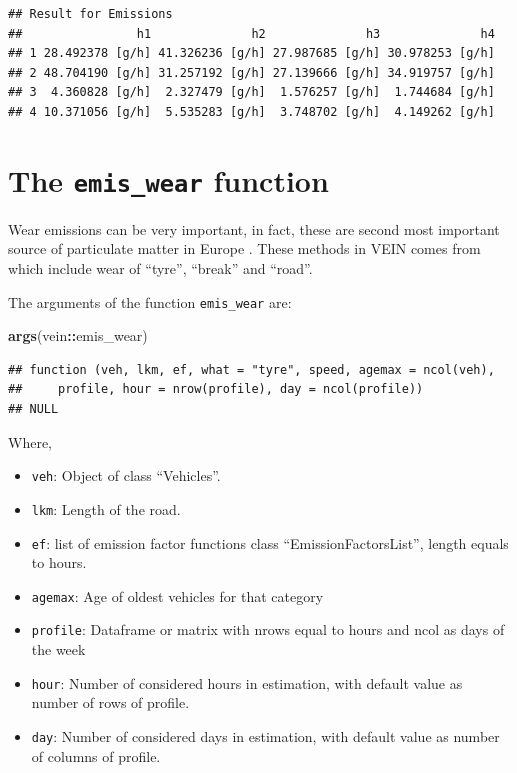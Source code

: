 \documentclass[12pt,graybox,envcountchap,sectrefs]{krantz}
\makeatletter
\newenvironment{Shaded}{\begin{snugshade}}{\end{snugshade}}
\newcommand{\KeywordTok}[1]{\textcolor[rgb]{0.13,0.29,0.53}{\textbf{#1}}}
\newcommand{\OperatorTok}[1]{\textcolor[rgb]{0.81,0.36,0.00}{\textbf{#1}}}
\newcommand{\NormalTok}[1]{#1}
\providecommand{\tightlist}{%
  \setlength{\itemsep}{0pt}\setlength{\parskip}{0pt}}
\newenvironment{kframe}{%
\medskip{}
\setlength{\fboxsep}{.8em}
 \def\at@end@of@kframe{}%
 \ifinner\ifhmode%
  \def\at@end@of@kframe{\end{minipage}}%
  \begin{minipage}{\columnwidth}%
 \fi\fi%
 \def\FrameCommand##1{\hskip\@totalleftmargin \hskip-\fboxsep
 \colorbox{shadecolor}{##1}\hskip-\fboxsep
     \hskip-\linewidth \hskip-\@totalleftmargin \hskip\columnwidth}%
 \MakeFramed {\advance\hsize-\width
   \@totalleftmargin\z@ \linewidth\hsize
   \@setminipage}}%
 {\par\unskip\endMakeFramed%
 \at@end@of@kframe}
\renewenvironment{Shaded}{\begin{kframe}}{\end{kframe}}
\theoremstyle{definition}
\theoremstyle{definition}
\theoremstyle{definition}
\theoremstyle{remark}
\makeatother
\begin{document}
\begin{verbatim}
## Result for Emissions 
##                h1              h2              h3              h4
## 1 28.492378 [g/h] 41.326236 [g/h] 27.987685 [g/h] 30.978253 [g/h]
## 2 48.704190 [g/h] 31.257192 [g/h] 27.139666 [g/h] 34.919757 [g/h]
## 3  4.360828 [g/h]  2.327479 [g/h]  1.576257 [g/h]  1.744684 [g/h]
## 4 10.371056 [g/h]  5.535283 [g/h]  3.748702 [g/h]  4.149262 [g/h]
\end{verbatim}

\section{\texorpdfstring{The \texttt{emis\_wear}
function}{The emis\_wear function}}\label{ew}

Wear emissions can be very important, in fact, these are second most
important source of particulate matter in Europe \citep{eear}. These
methods in VEIN comes from \citet{NtziachristosBoulter2009} which
include wear of ``tyre'', ``break'' and ``road''.

The arguments of the function \texttt{emis\_wear} are:

\begin{Shaded}
\begin{Highlighting}[]
\KeywordTok{args}\NormalTok{(vein}\OperatorTok{::}\NormalTok{emis_wear)}
\end{Highlighting}
\end{Shaded}

\begin{verbatim}
## function (veh, lkm, ef, what = "tyre", speed, agemax = ncol(veh), 
##     profile, hour = nrow(profile), day = ncol(profile)) 
## NULL
\end{verbatim}

Where,

\begin{itemize}
\tightlist
\item
  \texttt{veh}: Object of class ``Vehicles''.
\item
  \texttt{lkm}: Length of the road.
\item
  \texttt{ef}: list of emission factor functions class
  ``EmissionFactorsList'', length equals to hours.
\item
  \texttt{agemax}: Age of oldest vehicles for that category
\item
  \texttt{profile}: Dataframe or matrix with nrows equal to hours and
  ncol as days of the week
\item
  \texttt{hour}: Number of considered hours in estimation, with default
  value as number of rows of profile.
\item
  \texttt{day}: Number of considered days in estimation, with default
  value as number of columns of profile.
\end{itemize}
\end{document}
